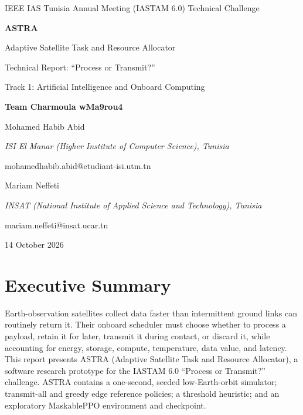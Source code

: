\documentclass[11pt,letterpaper]{article}
\begin{document}
\begin{titlepage}
\centering
\vspace*{1.5cm}
{\Large IEEE IAS Tunisia Annual Meeting (IASTAM 6.0) Technical Challenge\par}
\vspace{1.6cm}
{\huge\bfseries ASTRA\par}
\vspace{0.35cm}
{\LARGE Adaptive Satellite Task and Resource Allocator\par}
\vspace{0.5cm}
{\Large Technical Report: ``Process or Transmit?''\par}
\vspace{1.5cm}
{\large Track 1: Artificial Intelligence and Onboard Computing\par}
\vfill
{\large\bfseries Team Charmoula wMa9rou4\par}
\vspace{0.5cm}
Mohamed Habib Abid\par
\textit{ISI El Manar (Higher Institute of Computer Science), Tunisia}\par
\textrm{mohamedhabib.abid@etudiant-isi.utm.tn}\par
\vspace{0.4cm}
Mariam Neffeti\par
\textit{INSAT (National Institute of Applied Science and Technology), Tunisia}\par
\textrm{mariam.neffeti@insat.ucar.tn}\par
\vfill
{\large 14 October 2026\par}
\end{titlepage}

\section*{Executive Summary}
Earth-observation satellites collect data faster than intermittent ground links can routinely return it. Their onboard scheduler must choose whether to process a payload, retain it for later, transmit it during contact, or discard it, while accounting for energy, storage, compute, temperature, data value, and latency. This report presents ASTRA (Adaptive Satellite Task and Resource Allocator), a software research prototype for the IASTAM 6.0 ``Process or Transmit?'' challenge. ASTRA contains a one-second, seeded low-Earth-orbit simulator; transmit-all and greedy edge reference policies; a threshold heuristic; and an exploratory MaskablePPO environment and checkpoint.
\end{document}
